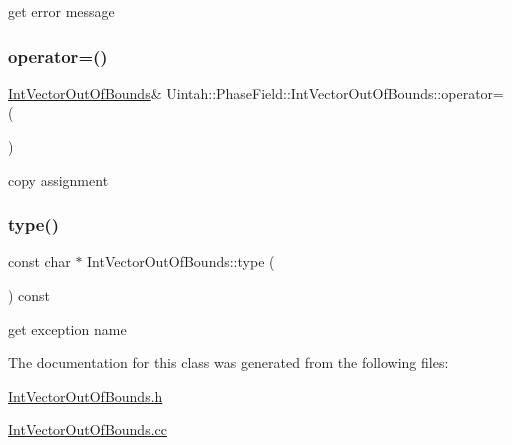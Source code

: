 get error message 

\mbox{\label{classUintah_1_1PhaseField_1_1IntVectorOutOfBounds_a03d63bed9bf7dbe56303d04acdb38709}} 
\subsubsection{\texorpdfstring{operator=()}{operator=()}}
{\footnotesize\ttfamily \hyperlink{classUintah_1_1PhaseField_1_1IntVectorOutOfBounds}{Int\+Vector\+Out\+Of\+Bounds}\& Uintah\+::\+Phase\+Field\+::\+Int\+Vector\+Out\+Of\+Bounds\+::operator= (\begin{DoxyParamCaption}\item[{const \hyperlink{classUintah_1_1PhaseField_1_1IntVectorOutOfBounds}{Int\+Vector\+Out\+Of\+Bounds}}]{ }\end{DoxyParamCaption})}



copy assignment 

\mbox{\label{classUintah_1_1PhaseField_1_1IntVectorOutOfBounds_a39e996278db91ce379302f8abe3932ea}} 
\subsubsection{\texorpdfstring{type()}{type()}}
{\footnotesize\ttfamily const char $\ast$ Int\+Vector\+Out\+Of\+Bounds\+::type (\begin{DoxyParamCaption}{ }\end{DoxyParamCaption}) const\hspace{0.3cm}{\ttfamily [virtual]}}



get exception name 



The documentation for this class was generated from the following files\+:\begin{DoxyCompactItemize}
\item 
\hyperlink{IntVectorOutOfBounds_8h}{Int\+Vector\+Out\+Of\+Bounds.\+h}\item 
\hyperlink{IntVectorOutOfBounds_8cc}{Int\+Vector\+Out\+Of\+Bounds.\+cc}\end{DoxyCompactItemize}
